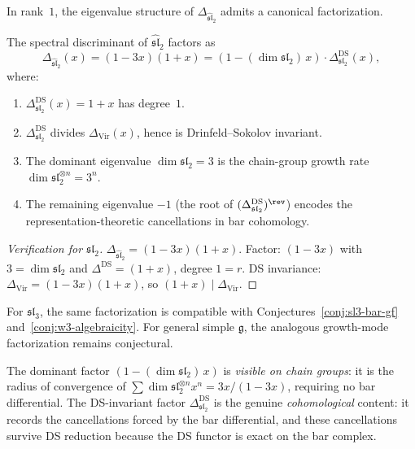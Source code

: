 In rank~\(1\), the eigenvalue structure of
\(\Delta_{\widehat{\mathfrak{sl}}_2}\) admits a canonical
factorization.

\begin{theorem}
\label{thm:growth-mode-factorization}
The spectral discriminant of \(\widehat{\mathfrak{sl}}_2\) factors as
\begin{equation}\label{eq:growth-mode-factor}
\Delta_{\widehat{\mathfrak{sl}}_2}(x)
=(1-3x)(1+x)
=(1-(\dim\mathfrak{sl}_2)\,x)\cdot
\Delta^{\mathrm{DS}}_{\mathfrak{sl}_2}(x),
\end{equation}
where:
\begin{enumerate}[label=\textup{(\roman*)}]
\item
\(\Delta^{\mathrm{DS}}_{\mathfrak{sl}_2}(x)=1+x\) has degree~\(1\).
\item
\(\Delta^{\mathrm{DS}}_{\mathfrak{sl}_2}\) divides
\(\Delta_{\mathrm{Vir}}(x)\), hence is
Drinfeld--Sokolov invariant.
\item
The dominant eigenvalue \(\dim\mathfrak{sl}_2=3\) is the
chain-group growth rate
\(\dim\mathfrak{sl}_2^{\otimes n}=3^n\).
\item
The remaining eigenvalue \(-1\)
\textup{(}the root of
\((\Delta^{\mathrm{DS}}_{\mathfrak{sl}_2})^{\rev}\)\textup{)}
encodes the
representation-theoretic cancellations in bar cohomology.
\end{enumerate}
\end{theorem}

\begin{proof}[Verification for \(\mathfrak{sl}_2\)]
\(\Delta_{\widehat{\mathfrak{sl}}_2}=(1{-}3x)(1{+}x)\).
Factor: \((1{-}3x)\) with \(3=\dim\mathfrak{sl}_2\) and
\(\Delta^{\mathrm{DS}}=(1{+}x)\), degree \(1=r\).
DS invariance: \(\Delta_{\mathrm{Vir}}=(1{-}3x)(1{+}x)\),
so \((1{+}x)\mid\Delta_{\mathrm{Vir}}\).
\end{proof}

\begin{remark}
For \(\mathfrak{sl}_3\), the same factorization is compatible with
Conjectures~\ref{conj:sl3-bar-gf} and~\ref{conj:w3-algebraicity}. For
general simple \(\mathfrak g\), the analogous growth-mode
factorization remains conjectural.
\end{remark}

\begin{remark}
The dominant factor \((1-(\dim\mathfrak{sl}_2)\,x)\) is
\emph{visible on chain groups}: it is the radius of
convergence of
\(\sum\dim\mathfrak{sl}_2^{\otimes n}x^n
=3x/(1{-}3x)\),
requiring no bar differential.
The DS-invariant factor \(\Delta^{\mathrm{DS}}_{\mathfrak{sl}_2}\) is the
genuine \emph{cohomological} content: it records the
cancellations forced by the bar differential, and these
cancellations survive DS reduction because the DS functor
is exact on the bar complex.
\end{remark}

